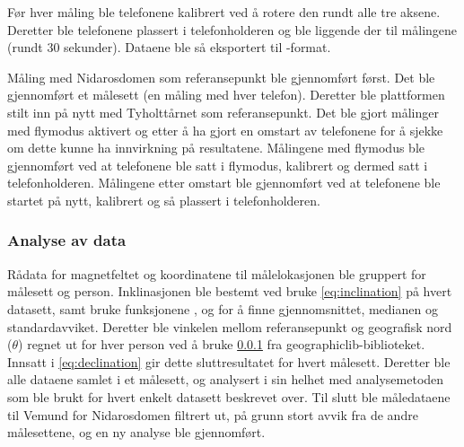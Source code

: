 Før hver måling ble telefonene kalibrert ved å rotere den rundt alle tre aksene. Deretter ble telefonene plassert i telefonholderen og ble liggende der til målingene (rundt $30$ sekunder). Dataene ble så eksportert til -format. 

Måling med Nidarosdomen som referansepunkt ble gjennomført først. Det ble gjennomført et målesett (en måling med hver telefon). Deretter ble plattformen stilt inn på nytt med Tyholttårnet som referansepunkt. Det ble gjort målinger med flymodus aktivert og etter å ha gjort en omstart av telefonene for å sjekke om dette kunne ha innvirkning på resultatene. Målingene med flymodus ble gjennomført ved at telefonene ble satt i flymodus, kalibrert og dermed satt i telefonholderen. Målingene etter omstart ble gjennomført ved at telefonene ble startet på nytt, kalibrert og så plassert i telefonholderen.

\subsubsection{Analyse av data}
Rådata for magnetfeltet og koordinatene til målelokasjonen ble gruppert for målesett og person.
Inklinasjonen ble bestemt ved bruke \eqref{eq:inclination} på hvert datasett, samt bruke funksjonene 
\href{https://numpy.org/doc/stable/reference/generated/numpy.mean.html#numpy.mean}{}, 
\href{https://numpy.org/doc/stable/reference/generated/numpy.median.html#numpy-median}{} og 
\href{https://docs.scipy.org/doc/scipy/reference/generated/scipy.stats.tstd.html#scipy.stats.tstd}
{} for å finne gjennomsnittet, medianen og 
standardavviket.
Deretter ble vinkelen mellom referansepunkt og geografisk nord ($\theta$) regnet ut for hver person ved å 
bruke \ref{} fra geographiclib-biblioteket.
Innsatt i \eqref{eq:declination} gir dette sluttresultatet for hvert målesett.
Deretter ble alle dataene samlet i et målesett, og analysert i sin helhet med analysemetoden som ble brukt 
for hvert enkelt datasett beskrevet over.
Til slutt ble måledataene til Vemund for Nidarosdomen filtrert ut, på grunn stort avvik fra de andre 
målesettene, og en ny analyse ble gjennomført.
 
